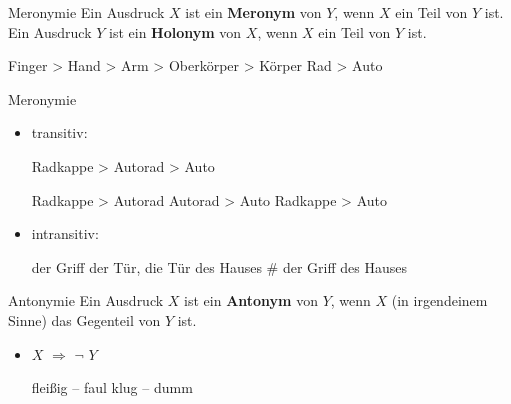 \begin{frame}

\begin{block}{Meronymie}
Ein Ausdruck $X$ ist ein \textbf{Meronym} von $Y$, wenn $X$ ein Teil von $Y$ ist.
Ein Ausdruck $Y$ ist ein \textbf{Holonym} von $X$, wenn $X$ ein Teil von $Y$ ist.
\end{block}

	\eal
	\ex Finger > Hand > Arm > Oberkörper > Körper
	\ex Rad > Auto
	\zl

%	
%
%		
%		

\end{frame}


\begin{frame}

\begin{block}{Meronymie}
\end{block}

\begin{itemize}	
	\item transitiv: 
	
\ea	Radkappe > Autorad > Auto
	
	\ea Radkappe > Autorad
	\ex Autorad > Auto
	\ex Radkappe > Auto
	\z
\z 
	
	\item intransitiv: 
	
\ea der Griff der Tür, die Tür des Hauses \ras \# der Griff des Hauses
	
	\z
\z	
	
\end{itemize}

\end{frame}

\begin{frame}

\begin{block}{Antonymie}
Ein Ausdruck $X$ ist ein \textbf{Antonym} von $Y$, wenn $X$ (in irgendeinem Sinne) das Gegenteil von $Y$ ist.
\end{block}

\begin{itemize}
	\item $X$ $\Rightarrow$ $\lnot$ $Y$
	
	\eal 
		\ex fleißig -- faul
		\ex klug -- dumm
	\zl
	
\end{itemize}

\end{frame}


